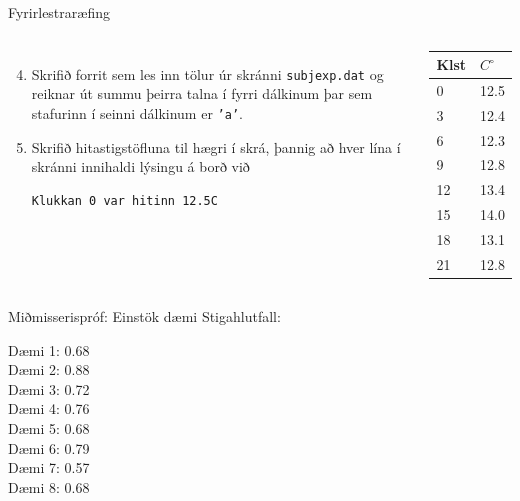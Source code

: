\documentclass{beamer}
\begin{document}
\begin{frame}[fragile]{Fyrirlestraræfing}
\begin{columns}
\begin{enumerate}
 \setcounter{enumi}{3}
 \item Skrifið forrit sem les inn tölur úr skránni \texttt{subjexp.dat} og reiknar út summu þeirra talna í fyrri dálkinum þar sem stafurinn í seinni dálkinum er \texttt{'a'}.
 \item Skrifið hitastigstöfluna til hægri í skrá, þannig að hver lína í skránni innihaldi lýsingu á borð við
\begin{verbatim}
Klukkan 0 var hitinn 12.5C
\end{verbatim}
\end{enumerate}
\begin{center}
\begin{tabular}{ll}
\toprule
Klst&$C^\circ$\\
\midrule
0&12.5\\
3&12.4\\
6&12.3\\
9&12.8\\
12&13.4\\
15&14.0\\
18&13.1\\
21&12.8\\
\bottomrule
\end{tabular}
\end{center}
\end{columns}
\end{frame}

\begin{frame}{Miðmisserispróf: Einstök dæmi}
Stigahlutfall:

Dæmi 1: 0.68\\
Dæmi 2: 0.88\\
Dæmi 3: 0.72\\
Dæmi 4: 0.76\\
Dæmi 5: 0.68\\
Dæmi 6: 0.79\\
Dæmi 7: 0.57\\
Dæmi 8: 0.68\\
\end{frame}
\end{document}
